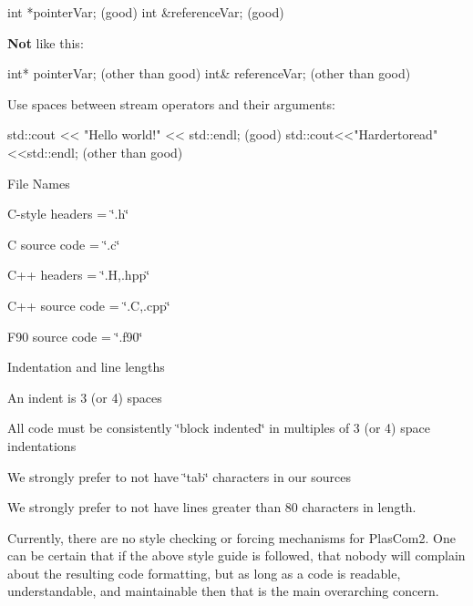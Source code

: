 \begin{DoxyItemize}
\begin{DoxyItemize}
\begin{DoxyCode}
\textcolor{keywordtype}{int} *pointerVar; (good)
\textcolor{keywordtype}{int} &referenceVar; (good)
\end{DoxyCode}
 {\bfseries Not} like this\+:~\newline

\begin{DoxyCode}
\textcolor{keywordtype}{int}* pointerVar; (other than good)
\textcolor{keywordtype}{int}& referenceVar; (other than good)
\end{DoxyCode}

\end{DoxyItemize}
\item Use spaces between stream operators and their arguments\+:~\newline

\begin{DoxyCode}
std::cout << \textcolor{stringliteral}{"Hello world!"} << std::endl; (good)
std::cout<<\textcolor{stringliteral}{"Hardertoread"}<<std::endl; (other than good)
\end{DoxyCode}

\item File Names
\begin{DoxyItemize}
\item C-\/style headers = \char`\"{}.\+h\char`\"{}
\item C source code = \char`\"{}.\+c\char`\"{}
\item C++ headers = \char`\"{}.\+H,.\+hpp\char`\"{}
\item C++ source code = \char`\"{}.\+C,.\+cpp\char`\"{}
\item F90 source code = \char`\"{}.\+f90\char`\"{}
\end{DoxyItemize}
\item Indentation and line lengths
\begin{DoxyItemize}
\item An indent is 3 (or 4) spaces
\item All code must be consistently \char`\"{}block indented\char`\"{} in multiples of 3 (or 4) space indentations
\item We strongly prefer to not have \char`\"{}tab\char`\"{} characters in our sources
\item We strongly prefer to not have lines greater than 80 characters in length.
\end{DoxyItemize}
\end{DoxyItemize}

Currently, there are no style checking or forcing mechanisms for Plas\+Com2. One can be certain that if the above style guide is followed, that nobody will complain about the resulting code formatting, but as long as a code is readable, understandable, and maintainable then that is the main overarching concern. 